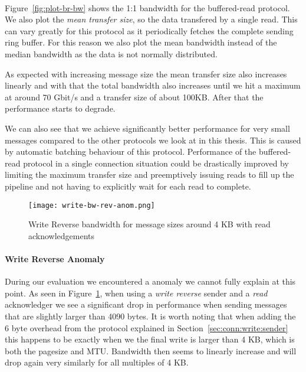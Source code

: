 \paragraph{} Figure~\ref{fig:plot-br-bw} shows the 1:1 bandwidth for the buffered-read protocol. We also plot the 
\emph{mean transfer size}, so the data transfered by a single read. This can vary greatly for this protocol as it periodically
fetches the complete sending ring buffer. For this reason we also plot the mean bandwidth instead of the median bandwidth 
as the data is not normally distributed.

As expected with increasing message size the mean transfer size also increases linearly and with that the 
total bandwidth also increases until we hit a maximum at around 70 Gbit/s and a transfer size of about 100KB. After that 
the performance starts to degrade. 

We can also see that we achieve significantly better performance for very small messages compared to the other protocols we
look at in this thesis. This is caused by automatic batching behaviour of this protocol. Performance of the buffered-read
protocol in a single connection situation could be drastically improved by limiting the maximum transfer size and 
preemptively issuing reads to fill up the pipeline and not having to explicitly wait for each
read to complete.


\begin{figure}[h]
\texttt{[image: write-bw-rev-anom.png]}
\caption{Write Reverse bandwidth for message sizes around 4 KB with read acknowledgements}
\label{fig:plot-write-rev-anom}
\end{figure}

\paragraph{Write Reverse Anomaly} During our evaluation we encountered a anomaly we cannot fully explain at
this point. As seen in Figure~\ref{fig:plot-write-rev-anom}, when using a \emph{write reverse} sender and a 
\emph{read} acknowledger we see a significant drop in performance when sending messages that are slightly larger
than 4090 bytes. It is worth noting that when adding the 6 byte overhead from the protocol explained in 
Section~\ref{sec:conn:write:sender} this happens to be exactly when we the final write is larger than 4 KB, 
which is both the pagesize and MTU. Bandwidth then seems to linearly increase and will drop again very similarly 
for all multiples of 4 KB.

